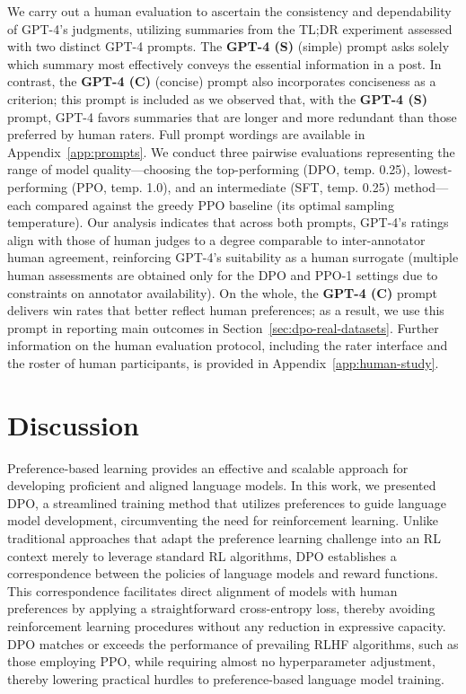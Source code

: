 We carry out a human evaluation to ascertain the consistency and dependability of GPT-4's judgments, utilizing summaries from the TL;DR experiment assessed with two distinct GPT-4 prompts. The \textbf{GPT-4 (S)} (simple) prompt asks solely which summary most effectively conveys the essential information in a post. In contrast, the \textbf{GPT-4 (C)} (concise) prompt also incorporates conciseness as a criterion; this prompt is included as we observed that, with the \textbf{GPT-4 (S)} prompt, GPT-4 favors summaries that are longer and more redundant than those preferred by human raters. Full prompt wordings are available in Appendix~\ref{app:prompts}. We conduct three pairwise evaluations representing the range of model quality—choosing the top-performing (DPO, temp. 0.25), lowest-performing (PPO, temp. 1.0), and an intermediate (SFT, temp. 0.25) method—each compared against the greedy PPO baseline (its optimal sampling temperature). Our analysis indicates that across both prompts, GPT-4’s ratings align with those of human judges to a degree comparable to inter-annotator human agreement, reinforcing GPT-4's suitability as a human surrogate (multiple human assessments are obtained only for the DPO and PPO-1 settings due to constraints on annotator availability). On the whole, the \textbf{GPT-4 (C)} prompt delivers win rates that better reflect human preferences; as a result, we use this prompt in reporting main outcomes in Section~\ref{sec:dpo-real-datasets}. Further information on the human evaluation protocol, including the rater interface and the roster of human participants, is provided in Appendix~\ref{app:human-study}.

\section{Discussion}
Preference-based learning provides an effective and scalable approach for developing proficient and aligned language models. In this work, we presented DPO, a streamlined training method that utilizes preferences to guide language model development, circumventing the need for reinforcement learning. Unlike traditional approaches that adapt the preference learning challenge into an RL context merely to leverage standard RL algorithms, DPO establishes a correspondence between the policies of language models and reward functions. This correspondence facilitates direct alignment of models with human preferences by applying a straightforward cross-entropy loss, thereby avoiding reinforcement learning procedures without any reduction in expressive capacity. DPO matches or exceeds the performance of prevailing RLHF algorithms, such as those employing PPO, while requiring almost no hyperparameter adjustment, thereby lowering practical hurdles to preference-based language model training.

